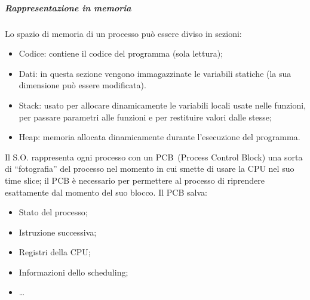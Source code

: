 \documentclass[
]{article}
\providecommand{\tightlist}{%
  \setlength{\itemsep}{0pt}\setlength{\parskip}{0pt}}
\begin{document}
{}

{}

{}

\subparagraph{\texorpdfstring{{Rappresentazione in
memoria}}{Rappresentazione in memoria}}\label{h.wxx5dyg8eang}

{Lo spazio di memoria di un processo può essere diviso in sezioni: }

{}

\begin{itemize}
\tightlist
\item
  {Codice}{: contiene il codice del programma (sola lettura);}
\end{itemize}

{}

\begin{itemize}
\tightlist
\item
  {Dati}{: in questa sezione vengono immagazzinate le variabili statiche
  (la sua dimensione può essere modificata).}
\end{itemize}

{}

\begin{itemize}
\tightlist
\item
  {Stack}{: usato per allocare dinamicamente le variabili locali usate
  nelle funzioni, per passare parametri alle funzioni e per restituire
  valori dalle stesse;}
\end{itemize}

{}

\begin{itemize}
\tightlist
\item
  {Heap}{: memoria allocata dinamicamente durante l'esecuzione del
  programma.}
\end{itemize}

{}

{Il S.O. rappresenta ogni processo con un }{PCB}{~(Process Control
Block) una sorta di ``fotografia'' del processo nel momento in cui
smette di usare la CPU nel suo time slice; il PCB è necessario per
permettere al processo di riprendere esattamente dal momento del suo
blocco. Il PCB salva:}

\begin{itemize}
\tightlist
\item
  {Stato del processo;}
\item
  {Istruzione successiva;}
\item
  {Registri della CPU;}
\item
  {Informazioni dello scheduling;}
\item
  {\ldots{}}
\end{itemize}
\end{document}
